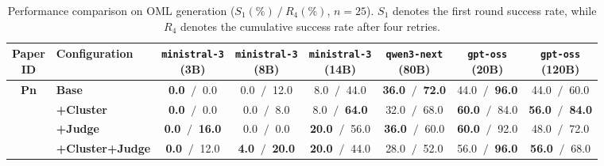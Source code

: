 \begin{table}[htbp]
    \centering
    \small
    \setlength{\tabcolsep}{4pt}
    \caption{Performance comparison on OML generation ($S_1(\%)~/~R_4(\%)$, $n=25$). $S_1$ denotes the first round success rate, while $R_4$ denotes the cumulative success rate after four retries.}
    \begin{tabular}{c|l|cccccc}
        \hline
        \makecell{\textbf{Paper} \\ \textbf{ID}} & \textbf{Configuration} & \makecell{\texttt{ministral-3} \\ (3B)} & \makecell{\texttt{ministral-3} \\ (8B)} & \makecell{\texttt{ministral-3} \\ (14B)} & \makecell{\texttt{qwen3-next} \\ (80B)} & \makecell{\texttt{gpt-oss} \\ (20B)} & \makecell{\texttt{gpt-oss} \\ (120B)} \\
        \hline
        
        \multirow{4}{*}{\textbf{Pn}} 
          & \textbf{Base}& \textbf{0.0} $~/~$ 0.0 & 0.0 $~/~$ 12.0 & 8.0 $~/~$ 44.0 & \textbf{36.0} $~/~$ \textbf{72.0} & 44.0 $~/~$ \textbf{96.0} & 44.0 $~/~$ 60.0 \\
          & \textbf{+Cluster}& \textbf{0.0} $~/~$ 0.0 & 0.0 $~/~$ 8.0 & 8.0 $~/~$ \textbf{64.0} & 32.0 $~/~$ 68.0 & \textbf{60.0} $~/~$ 84.0 & \textbf{56.0} $~/~$ \textbf{84.0} \\
          & \textbf{+Judge}& \textbf{0.0} $~/~$ \textbf{16.0} & 0.0 $~/~$ 0.0 & \textbf{20.0} $~/~$ 56.0 & \textbf{36.0} $~/~$ 60.0 & \textbf{60.0} $~/~$ 92.0 & 48.0 $~/~$ 72.0 \\
          & \textbf{+Cluster+Judge}& \textbf{0.0} $~/~$ 12.0 & \textbf{4.0} $~/~$ \textbf{20.0} & \textbf{20.0} $~/~$ 44.0 & 28.0 $~/~$ 52.0 & 56.0 $~/~$ \textbf{96.0} & \textbf{56.0} $~/~$ 68.0 \\
        \hline
        
    \end{tabular}
    \label{tab:success_rates_pn}
\end{table}